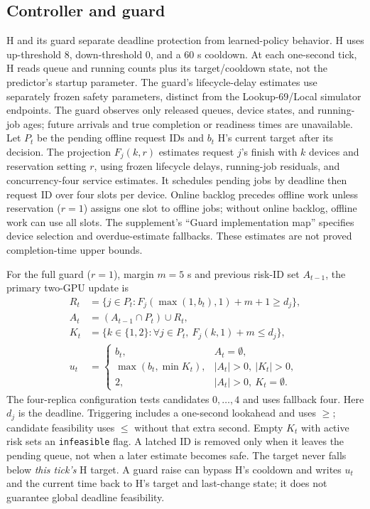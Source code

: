 \subsection{Controller and guard}
H and its guard separate deadline protection from learned-policy behavior. H uses up-threshold 8, down-threshold 0, and a 60 s cooldown. At each one-second
tick, H reads queue and running counts plus its target/cooldown state, not the
predictor's startup parameter. The guard's lifecycle-delay estimates use separately
frozen safety parameters, distinct from the Lookup-69/Local simulator endpoints.
The guard observes only released queues, device states, and running-job ages;
future arrivals and true completion or readiness times are unavailable. Let $P_t$
be the pending offline request IDs and $b_t$ H's current target after its decision.
The projection $F_j(k,r)$ estimates request $j$'s finish with $k$ devices and
reservation setting $r$, using frozen lifecycle delays, running-job residuals,
and concurrency-four service estimates. It schedules pending jobs by deadline
then request ID over four slots per device. Online backlog precedes offline
work unless reservation ($r=1$) assigns one slot to offline jobs; without online
backlog, offline work can use all slots. The supplement's ``Guard implementation map'' specifies device selection
and overdue-estimate fallbacks. These estimates are not proved completion-time
upper bounds.

For the full guard ($r=1$), margin $m=5$ s and previous risk-ID set $A_{t-1}$,
the primary two-GPU update is
\begin{align}
 R_t &= \{j\in P_t:F_j(\max(1,b_t),1)+m+1\geq d_j\},\nonumber\\
 A_t &= (A_{t-1}\cap P_t)\cup R_t,\nonumber\\
 K_t &= \{k\in\{1,2\}:\forall j\in P_t,\ F_j(k,1)+m\leq d_j\},\nonumber\\
 u_t &= \begin{cases}
 b_t,& A_t=\emptyset,\\
 \max(b_t,\min K_t),& |A_t|>0,\ |K_t|>0,\\
 2,& |A_t|>0,\ K_t=\emptyset.
 \end{cases}
 \label{eq:guard-update}
\end{align}
The four-replica configuration tests candidates $0,\ldots,4$ and uses fallback four.
Here $d_j$ is the deadline. Triggering includes a one-second lookahead and uses
$\geq$; candidate feasibility uses $\leq$ without that extra second. Empty
$K_t$ with active risk sets an \texttt{infeasible} flag. A latched ID is removed
only when it leaves the pending queue, not when a later estimate becomes safe.
The target never falls below \emph{this tick's} H target. A guard raise can bypass
H's cooldown and writes $u_t$ and the current time back to H's target and
last-change state; it does not guarantee global deadline feasibility.


